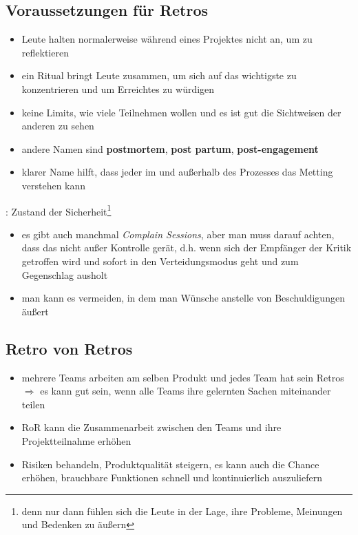 \subsection{Voraussetzungen für Retros}

\begin{itemize}
  \item Leute halten normalerweise während eines Projektes nicht an, um zu reflektieren
  \item ein Ritual bringt Leute zusammen, um sich auf das wichtigste zu konzentrieren und um
    Erreichtes zu würdigen
  \item keine Limits, wie viele Teilnehmen wollen und es ist gut die Sichtweisen der anderen zu
    sehen
\end{itemize}



\begin{itemize}
  \item andere Namen sind \textbf{postmortem}, \textbf{post partum}, \textbf{post-engagement}
  \item klarer Name hilft, dass jeder im und außerhalb des Prozesses das Metting verstehen kann
\end{itemize}


: Zustand der Sicherheit\footnote{denn nur dann fühlen sich die Leute in der Lage, ihre Probleme, Meinungen und Bedenken zu äußern}



\begin{itemize}
  \item es gibt auch manchmal \textit{Complain Sessions}, aber man muss darauf achten, dass das nicht
    außer Kontrolle gerät, d.h. wenn sich der Empfänger der Kritik getroffen wird und sofort in den
    Verteidungsmodus geht und zum Gegenschlag ausholt
  \item man kann es vermeiden, in dem man Wünsche anstelle von Beschuldigungen äußert
\end{itemize}


\subsection{Retro von Retros}

\begin{itemize}
  \item mehrere Teams arbeiten am selben Produkt und jedes Team hat sein Retros $\Rightarrow$  es
  kann gut sein, wenn alle Teams ihre gelernten Sachen miteinander teilen
  \item RoR kann die Zusammenarbeit zwischen den Teams und ihre Projektteilnahme erhöhen
  \item Risiken behandeln, Produktqualität steigern, es kann auch die Chance erhöhen, brauchbare
    Funktionen schnell und kontinuierlich auszuliefern
\end{itemize}


